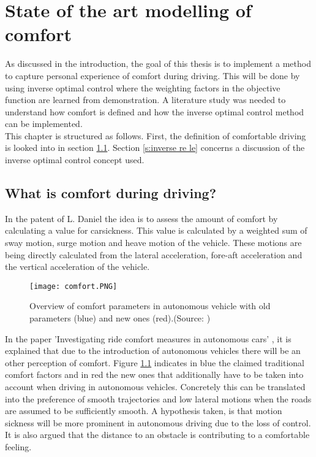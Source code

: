 \chapter{State of the art modelling of comfort}
\label{cha:Literature_study}
As discussed in the introduction, the goal of this thesis is to implement a method to capture personal experience of comfort during driving. This will be done by using inverse optimal control where the weighting factors in the objective function are learned from demonstration. A literature study was needed to understand how comfort is defined and how the inverse optimal control method can be implemented.\\

This chapter is structured as follows. First, the definition of comfortable driving is looked into in section \ref{s:comfort_parameters}. Section \ref{s:inverse re le} concerns a discussion of the inverse optimal control concept used.

\section{What is comfort during driving?}
\label{s:comfort_parameters}
In the patent of L. Daniel \cite{Daniel2018} the idea is to assess the amount of comfort by calculating a value for carsickness. This value is calculated by a weighted sum of sway motion, surge motion and heave motion of the vehicle. These motions are being directly calculated from the lateral acceleration, fore-aft acceleration and the vertical acceleration of the vehicle. \\

\begin{figure}[h!]
	\centering
	\texttt{[image: comfort.PNG]}
	\caption{Overview of comfort parameters in autonomous vehicle with old parameters (blue) and new ones (red).(Source: \cite{Elbanhawi2015})}
	\label{fig:Comfort}
\end{figure} 

In the paper 'Investigating ride comfort measures in autonomous cars' \cite{Elbanhawi2015}, it is explained that due to the introduction of autonomous vehicles there will be an other perception of comfort. Figure \ref{fig:Comfort} indicates in blue the claimed traditional comfort factors and in red the new ones that additionally have to be taken into account when driving in autonomous vehicles. Concretely this can be translated into the preference of smooth trajectories and low lateral motions when the roads are assumed to be sufficiently smooth. A hypothesis taken, is that motion sickness will be more prominent in autonomous driving due to the loss of control. It is also argued that the distance to an obstacle is contributing to a comfortable feeling.\\

